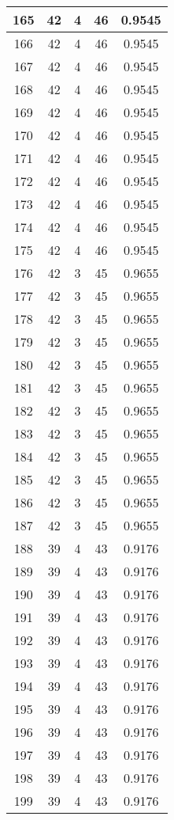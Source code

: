 \documentclass[letterpaper, 12pt]{article}
\begin{document}
\begin{longtable}{|c|c|c|c|c|}
\hline
165 & 42 & 4 & 46 & 0.9545 \\
\hline
166 & 42 & 4 & 46 & 0.9545 \\
\hline
167 & 42 & 4 & 46 & 0.9545 \\
\hline
168 & 42 & 4 & 46 & 0.9545 \\
\hline
169 & 42 & 4 & 46 & 0.9545 \\
\hline
170 & 42 & 4 & 46 & 0.9545 \\
\hline
171 & 42 & 4 & 46 & 0.9545 \\
\hline
172 & 42 & 4 & 46 & 0.9545 \\
\hline
173 & 42 & 4 & 46 & 0.9545 \\
\hline
174 & 42 & 4 & 46 & 0.9545 \\
\hline
175 & 42 & 4 & 46 & 0.9545 \\
\hline
176 & 42 & 3 & 45 & 0.9655 \\
\hline
177 & 42 & 3 & 45 & 0.9655 \\
\hline
178 & 42 & 3 & 45 & 0.9655 \\
\hline
179 & 42 & 3 & 45 & 0.9655 \\
\hline
180 & 42 & 3 & 45 & 0.9655 \\
\hline
181 & 42 & 3 & 45 & 0.9655 \\
\hline
182 & 42 & 3 & 45 & 0.9655 \\
\hline
183 & 42 & 3 & 45 & 0.9655 \\
\hline
184 & 42 & 3 & 45 & 0.9655 \\
\hline
185 & 42 & 3 & 45 & 0.9655 \\
\hline
186 & 42 & 3 & 45 & 0.9655 \\
\hline
187 & 42 & 3 & 45 & 0.9655 \\
\hline
188 & 39 & 4 & 43 & 0.9176 \\
\hline
189 & 39 & 4 & 43 & 0.9176 \\
\hline
190 & 39 & 4 & 43 & 0.9176 \\
\hline
191 & 39 & 4 & 43 & 0.9176 \\
\hline
192 & 39 & 4 & 43 & 0.9176 \\
\hline
193 & 39 & 4 & 43 & 0.9176 \\
\hline
194 & 39 & 4 & 43 & 0.9176 \\
\hline
195 & 39 & 4 & 43 & 0.9176 \\
\hline
196 & 39 & 4 & 43 & 0.9176 \\
\hline
197 & 39 & 4 & 43 & 0.9176 \\
\hline
198 & 39 & 4 & 43 & 0.9176 \\
\hline
199 & 39 & 4 & 43 & 0.9176 \\
\hline
\end{longtable}
\end{document}
